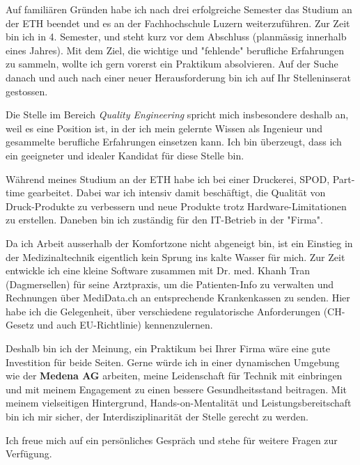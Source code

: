 \documentclass[11pt, a4paper]{awesome-cv}
\begin{document}
\makecvheader

\makelettertitle

\begin{cvletter}

Auf familiären Gründen habe ich nach drei erfolgreiche Semester das Studium an der ETH beendet und es an der Fachhochschule Luzern weiterzuführen. Zur Zeit bin ich in 4. Semester, und steht kurz vor dem Abschluss (planmässig innerhalb eines Jahres). Mit dem Ziel, die wichtige und "fehlende" berufliche Erfahrungen zu sammeln, wollte ich gern vorerst ein Praktikum absolvieren. Auf der Suche danach und auch nach einer neuer Herausforderung bin ich auf Ihr Stelleninserat gestossen.

Die Stelle im Bereich \textit{Quality Engineering} spricht mich insbesondere deshalb an, weil es eine Position ist, in der ich mein gelernte Wissen als Ingenieur und gesammelte berufliche Erfahrungen einsetzen kann. Ich bin überzeugt, dass ich ein geeigneter und idealer Kandidat für diese Stelle bin.

Während meines Studium an der ETH habe ich bei einer Druckerei, SPOD, Part-time gearbeitet. Dabei war ich intensiv damit beschäftigt, die Qualität von Druck-Produkte zu verbessern und neue Produkte trotz Hardware-Limitationen zu erstellen. Daneben bin ich zuständig für den IT-Betrieb in der "Firma".
 
Da ich Arbeit ausserhalb der Komfortzone nicht abgeneigt bin, ist ein Einstieg in der Medizinaltechnik eigentlich kein Sprung ins kalte Wasser für mich. Zur Zeit entwickle ich eine kleine Software zusammen mit Dr. med. Khanh Tran (Dagmersellen) für seine Arztpraxis, um die Patienten-Info zu verwalten und Rechnungen über MediData.ch an entsprechende Krankenkassen zu senden. Hier habe ich die Gelegenheit, über verschiedene regulatorische Anforderungen (CH-Gesetz und auch EU-Richtlinie) kennenzulernen. 

Deshalb bin ich der Meinung, ein Praktikum bei Ihrer Firma wäre eine gute Investition für beide Seiten. Gerne würde ich in einer dynamischen Umgebung wie der \textbf{Medena AG} arbeiten, meine Leidenschaft für Technik mit einbringen und mit meinem Engagement zu einen bessere Gesundheitsstand beitragen. Mit meinem vielseitigen Hintergrund, Hands-on-Mentalität und Leistungsbereitschaft bin ich mir sicher, der Interdisziplinarität der Stelle gerecht zu werden.

Ich freue mich auf ein persönliches Gespräch und stehe für weitere Fragen zur Verfügung.

\end{cvletter}

\makeletterclosing
\end{document}
